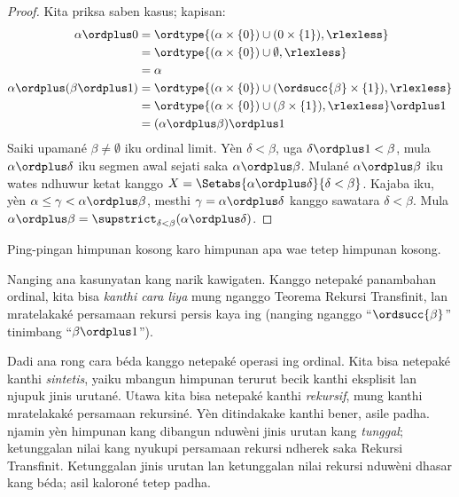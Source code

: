 \documentclass[../../../include/open-logic-section]{subfiles}
\begin{document}
\begin{proof}
Kita priksa saben kasus; kapisan:
\begin{align*}
	\alpha \ordplus  0
	& = \ordtype{(\alpha \times \{0\}) \cup (0 \times \{1\}), \rlexless} \\
	&= \ordtype{(\alpha \times \{0\}) \cup \emptyset, \rlexless}\\
	&= \alpha\\
	\alpha \ordplus (\beta \ordplus  1)
	&= \ordtype{(\alpha\times \{0\}) \cup (\ordsucc{\beta}\times \{1\}), \rlexless} \\
	&= \ordtype{(\alpha\times \{0\}) \cup (\beta \times \{1\}), \rlexless} \ordplus 1\\
	&= (\alpha \ordplus  \beta) \ordplus  1
\end{align*}
Saiki upamané $\beta \neq \emptyset$ iku ordinal limit. Yèn $\delta < \beta$, uga
$\delta\ordplus 1 < \beta$, mula $\alpha \ordplus \delta$ iku
segmen awal sejati saka $\alpha \ordplus \beta$. Mulané $\alpha
\ordplus \beta$ iku wates ndhuwur ketat kanggo $X = \Setabs{\alpha
\ordplus \delta}{\delta < \beta}$. Kajaba iku, yèn $\alpha \leq \gamma <
\alpha \ordplus \beta$, mesthi $\gamma = \alpha \ordplus
\delta$ kanggo sawatara $\delta < \beta$. Mula $\alpha \ordplus \beta =
\supstrict_{\delta< \beta}(\alpha\ordplus \delta)$.
\end{proof}
Ping-pingan himpunan kosong karo himpunan apa wae tetep himpunan kosong.

Nanging ana kasunyatan kang narik kawigaten. Kanggo netepaké
panambahan ordinal, kita bisa \emph{kanthi cara liya} mung nganggo
Teorema Rekursi Transfinit, lan mratelakaké persamaan rekursi
persis kaya ing  (nanging nganggo
“$\ordsucc{\beta}$” tinimbang “$\beta \ordplus 1$”).

Dadi ana rong cara béda kanggo netepaké operasi ing ordinal.
Kita bisa netepaké kanthi \emph{sintetis}, yaiku mbangun himpunan
terurut becik kanthi eksplisit lan njupuk jinis urutané. Utawa
kita bisa netepaké kanthi \emph{rekursif}, mung kanthi mratelakaké
persamaan rekursiné. Yèn ditindakake kanthi bener, asile padha.
 njamin
yèn himpunan kang dibangun nduwèni jinis urutan kang \emph{tunggal};
ketunggalan nilai kang nyukupi persamaan rekursi ndherek saka
Rekursi Transfinit.
Ketunggalan jinis urutan lan ketunggalan nilai rekursi nduwèni dhasar kang béda; asil kaloroné tetep padha.
\end{document}
